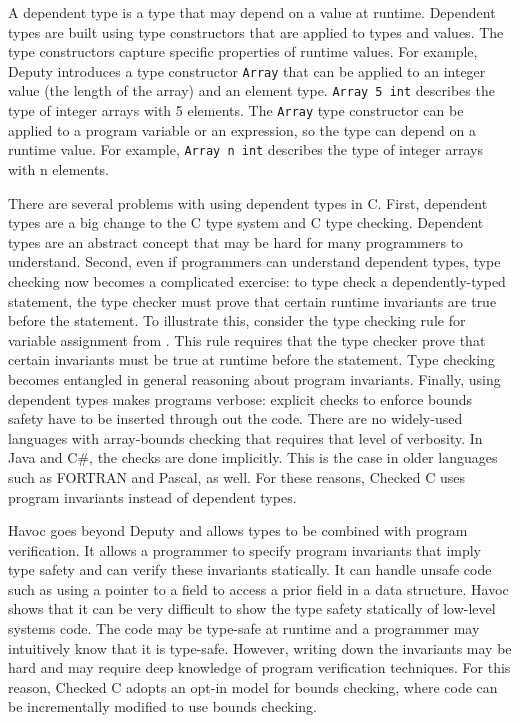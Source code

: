 A dependent type is a type that may depend on a value at runtime.
Dependent types are built using type constructors that are applied to
types and values. The type constructors capture specific properties of
runtime values. For example, Deputy introduces a type constructor
\verb|Array| that can be applied to an integer value (the length of the
array) and an element type. \verb|Array 5 int| describes the type of
integer arrays with 5 elements. The \verb|Array| type constructor can be
applied to a program variable or an expression, so the type can depend
on a runtime value. For example, \verb|Array n int| describes the type
of integer arrays with n elements.

There are several problems with using dependent types in C.
First, dependent types are a big change to the
C type system and C type checking. Dependent types are an abstract
concept that may be hard for many programmers to understand. 
Second, even if
programmers can understand dependent types, type checking now becomes a
complicated exercise: to type check a dependently-typed statement, the
type checker must prove that certain runtime invariants are true before
the statement. To illustrate this, consider the type checking rule for
variable assignment from \cite{Condit2007}. This
rule requires that the type checker prove that certain invariants must
be true at runtime before the statement. Type checking becomes entangled
in general reasoning about program invariants.
Finally, using dependent types makes programs verbose: explicit
checks to enforce bounds safety have to be inserted through out the code. There
are no widely-used languages with array-bounds checking
that requires that level of verbosity. In Java and C\#, the checks are
done implicitly. This is the case in older languages such as FORTRAN
and Pascal, as well.  For these reasons, Checked C uses program invariants
instead of dependent types.

Havoc \cite{Condit2009} goes beyond Deputy and allows types to be combined with program
verification. It allows a programmer to specify program invariants that
imply type safety and can verify these invariants statically. It can
handle unsafe code such as using a pointer to a field to access a prior
field in a data structure.    Havoc shows that it can be very difficult
to show the type safety statically of  low-level systems code. 
The code may be type-safe at runtime and a programmer may intuitively know that it is type-safe.  However, writing down the invariants may be hard and may require deep
knowledge of program verification techniques. For this reason,
Checked C adopts an opt-in model for bounds checking, where code
can be incrementally modified to use bounds checking.

